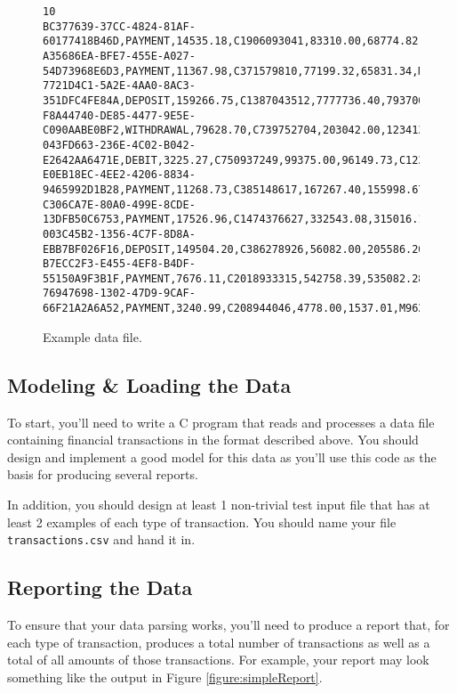 \documentclass[12pt]{scrartcl}
\begin{document}
\begin{figure}[ht]
\begin{verbatim}
10
BC377639-37CC-4824-81AF-60177418B46D,PAYMENT,14535.18,C1906093041,83310.00,68774.82,M95867054
A35686EA-BFE7-455E-A027-54D73968E6D3,PAYMENT,11367.98,C371579810,77199.32,65831.34,M1932650331
7721D4C1-5A2E-4AA0-8AC3-351DFC4FE84A,DEPOSIT,159266.75,C1387043512,7777736.40,7937003.15,C553899299
F8A44740-DE85-4477-9E5E-C090AABE0BF2,WITHDRAWAL,79628.70,C739752704,203042.00,123413.30,C579345824
043FD663-236E-4C02-B042-E2642AA6471E,DEBIT,3225.27,C750937249,99375.00,96149.73,C1232504595
E0EB18EC-4EE2-4206-8834-9465992D1B28,PAYMENT,11268.73,C385148617,167267.40,155998.67,M1084205719
C306CA7E-80A0-499E-8CDE-13DFB50C6753,PAYMENT,17526.96,C1474376627,332543.08,315016.12,M1944361847
003C45B2-1356-4C7F-8D8A-EBB7BF026F16,DEPOSIT,149504.20,C386278926,56082.00,205586.20,C1113941243
B7ECC2F3-E455-4EF8-B4DF-55150A9F3B1F,PAYMENT,7676.11,C2018933315,542758.39,535082.28,M1018630839
76947698-1302-47D9-9CAF-66F21A2A6A52,PAYMENT,3240.99,C208944046,4778.00,1537.01,M962275185
\end{verbatim}
\caption{Example data file.}
\label{figure:dataFile}
\end{figure}

\subsection*{Modeling \& Loading the Data}

To start, you'll need to write a C program that reads and processes 
a data file containing financial transactions in the format described above.  
You should design and implement a good model for this data as you'll use 
this code as the basis for producing several reports.

In addition, you should design at least 1 non-trivial test input file that 
has at least 2 examples of each type of transaction.  You should name your
file \texttt{transactions.csv} and hand it in.

\subsection*{Reporting the Data}

To ensure that your data parsing works, you'll need to produce a report
that, for each type of transaction, produces a total number of transactions 
as well as a total of all amounts of those transactions.  For example, 
your report may look something like the output in Figure 
\ref{figure:simpleReport}.
\end{document}
